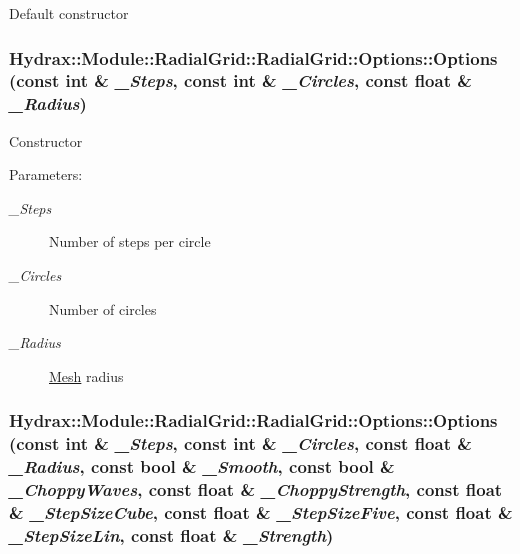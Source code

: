 Default constructor \hypertarget{struct_hydrax_1_1_module_1_1_radial_grid_1_1_options_574fc5fbf5d20a1fbc5af03fea97bbca}{
\subsubsection[{Options}]{\setlength{\rightskip}{0pt plus 5cm}Hydrax::Module::RadialGrid::RadialGrid::Options::Options (const int \& {\em \_\-Steps}, \/  const int \& {\em \_\-Circles}, \/  const float \& {\em \_\-Radius})}}
\label{struct_hydrax_1_1_module_1_1_radial_grid_1_1_options_574fc5fbf5d20a1fbc5af03fea97bbca}


Constructor \begin{Desc}
\item[Parameters:]
\begin{description}
\item[{\em \_\-Steps}]Number of steps per circle \item[{\em \_\-Circles}]Number of circles \item[{\em \_\-Radius}]\hyperlink{class_hydrax_1_1_mesh}{Mesh} radius \end{description}
\end{Desc}
\hypertarget{struct_hydrax_1_1_module_1_1_radial_grid_1_1_options_e270a3ae95902e237814a32a64a916c5}{
\subsubsection[{Options}]{\setlength{\rightskip}{0pt plus 5cm}Hydrax::Module::RadialGrid::RadialGrid::Options::Options (const int \& {\em \_\-Steps}, \/  const int \& {\em \_\-Circles}, \/  const float \& {\em \_\-Radius}, \/  const bool \& {\em \_\-Smooth}, \/  const bool \& {\em \_\-ChoppyWaves}, \/  const float \& {\em \_\-ChoppyStrength}, \/  const float \& {\em \_\-StepSizeCube}, \/  const float \& {\em \_\-StepSizeFive}, \/  const float \& {\em \_\-StepSizeLin}, \/  const float \& {\em \_\-Strength})}}
\label{struct_hydrax_1_1_module_1_1_radial_grid_1_1_options_e270a3ae95902e237814a32a64a916c5}


